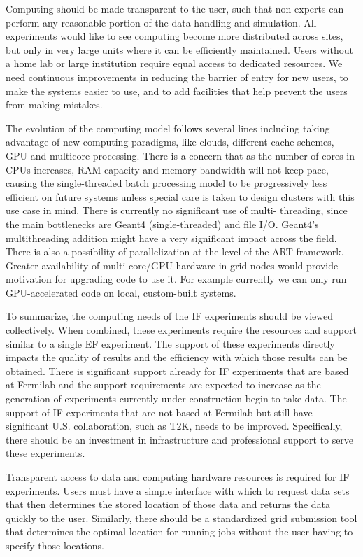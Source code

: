 \begin{itemize}
Computing should be made transparent to the user, such that non-experts can
perform any reasonable portion of the data handling and simulation. All
experiments would like to see computing become more distributed across sites,
but only in very large units where it can be efficiently maintained.  Users
without a home lab or large institution require equal access to dedicated
resources. We need  continuous improvements in reducing the barrier of entry
for new users, to make the systems easier to use, and to add facilities that
help prevent the users from making mistakes.

The evolution of the computing model follows several lines including taking
advantage of new computing paradigms, like clouds, different cache schemes,
GPU and multicore processing. There is a concern that as the number of cores
in CPUs increases, RAM capacity and memory bandwidth will not keep pace,
causing the single-threaded batch processing model to be progressively less
efficient on future systems unless special care is taken to design clusters
with this use case in mind. There is currently no significant use of multi-
threading, since the main bottlenecks are Geant4 (single-threaded) and file
I/O. Geant4's multithreading addition might have a very significant impact
across the field. There is also a possibility of parallelization at the level
of the ART framework. Greater availability of multi-core/GPU hardware in grid
nodes would provide motivation for upgrading code to use it. For example
currently we can only run GPU-accelerated code on local, custom-built systems.

\end{itemize}

To summarize, the computing needs of the IF experiments should be viewed
collectively.  When combined, these experiments require the resources and
support similar to a single EF experiment.  The support of these experiments
directly impacts the quality of results and the efficiency with which those
results can be obtained.  There is significant support already for IF
experiments that are based at Fermilab and the support requirements are
expected to increase as the generation of experiments currently under
construction begin to take data.  The support of IF experiments that are not
based at Fermilab but still have significant U.S. collaboration, such as T2K,
needs to be improved.  Specifically, there should be an investment in
infrastructure and professional support to serve these experiments.

Transparent access to data and computing hardware resources is required for IF
experiments.   Users must have a simple interface with which to request data
sets that then determines the stored location of those data and returns the
data quickly to the user.  Similarly, there should be a standardized grid
submission tool that determines the optimal location for running jobs without
the user having to specify those locations.

